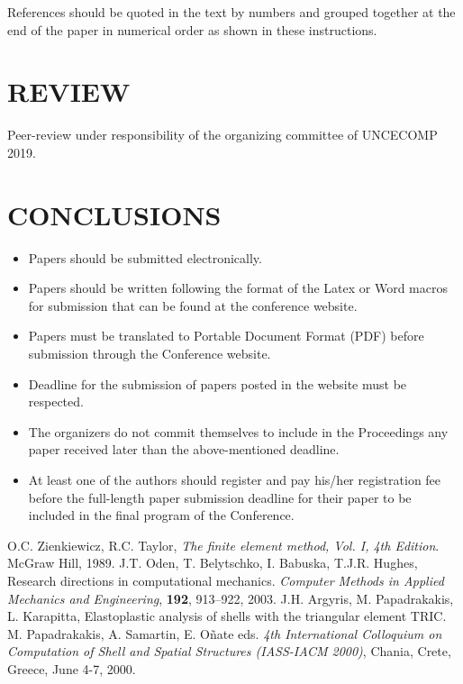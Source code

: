 \documentclass{uncecomp2019}
\begin{document}
References should be quoted in the text by numbers \cite{Zienkiewicz,Oden}
and grouped together at the end of the paper in numerical order as shown in
these instructions.

\section{REVIEW}

Peer-review under responsibility of the organizing committee of UNCECOMP 2019.

\section{CONCLUSIONS}

\begin{itemize}
  \item Papers should be submitted electronically.
  \item Papers should be written following the format of the Latex or Word
    macros for submission that can be found at the conference website.
  \item Papers must be translated to Portable Document Format (PDF) before
    submission through the Conference website.
  \item Deadline for the submission of papers posted in the website must be respected.
  \item The organizers do not commit themselves to include in the Proceedings
    any paper received later than the above-mentioned deadline.
  \item At least one of the authors should register and pay his/her registration
    fee before the full-length paper submission deadline for their paper to be
    included in the final program of the Conference.
\end{itemize}

\begin{thebibliography}{99}
   O.C. Zienkiewicz, R.C. Taylor,
    \textit{The finite element method, Vol. I, 4th Edition}. McGraw Hill, 1989.
   J.T. Oden, T. Belytschko, I. Babuska, T.J.R. Hughes,
    Research directions in computational mechanics.
    \textit{Computer Methods in Applied Mechanics and Engineering}, \textbf{192},
      913--922, 2003.
   J.H. Argyris, M. Papadrakakis, L. Karapitta,
    Elastoplastic analysis of shells with the triangular element TRIC.
    M. Papadrakakis, A. Samartin, E. O\~{n}ate eds.
    \textit{4th International Colloquium on Computation of Shell and Spatial
    Structures (IASS-IACM 2000)}, Chania, Crete, Greece, June 4-7, 2000.
\end{thebibliography}
\end{document}

